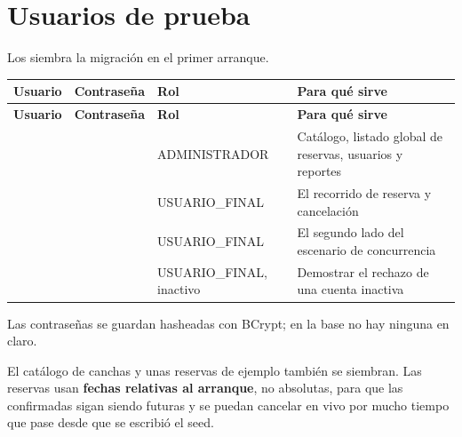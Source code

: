
\section{Usuarios de prueba}

Los siembra la migración  en el primer arranque.

\begin{center}
\small
\begin{xltabular}{\textwidth}{@{}l l L{3.4cm} Y@{}}
\toprule
\textbf{Usuario} & \textbf{Contraseña} & \textbf{Rol} & \textbf{Para qué sirve} \\
\midrule
\endfirsthead
\toprule
\textbf{Usuario} & \textbf{Contraseña} & \textbf{Rol} & \textbf{Para qué sirve} \\
\midrule
\endhead
{} &  & ADMINISTRADOR &
  Catálogo, listado global de reservas, usuarios y reportes \\
 &  & USUARIO\_FINAL &
  El recorrido de reserva y cancelación \\
 &  & USUARIO\_FINAL &
  El segundo lado del escenario de concurrencia \\
 &  & USUARIO\_FINAL, inactivo &
  Demostrar el rechazo de una cuenta inactiva \\
\bottomrule
\end{xltabular}
\end{center}

Las contraseñas se guardan hasheadas con BCrypt; en la base no hay ninguna en
claro.


El catálogo de canchas y unas reservas de ejemplo también se siembran. Las
reservas usan \textbf{fechas relativas al arranque}, no absolutas, para que las
confirmadas sigan siendo futuras y se puedan cancelar en vivo por mucho tiempo
que pase desde que se escribió el seed.
